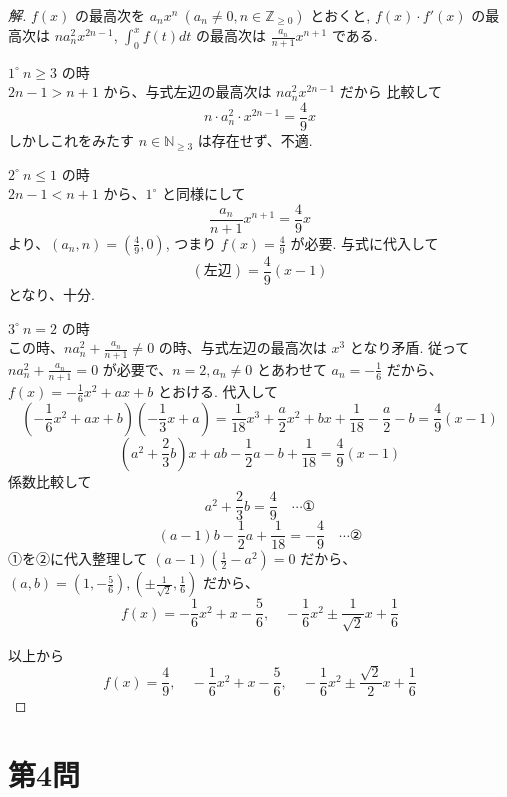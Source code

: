 \documentclass[../main.tex]{subfiles}
\begin{document}
\begin{proof}[解]
  $f(x)$ の最高次を $a_n x^n \ (a_n \ne 0, n \in \mathbb{Z}_{\ge 0})$ とおくと,
  $f(x) \cdot f'(x)$ の最高次は $n a_n^2 x^{2n-1}$, $\int_0^x f(t) dt$ の最高次は $\frac{a_n}{n+1} x^{n+1}$ である.

  \medskip
  $1^\circ \ n \ge 3$ の時\\
  $2n-1 > n+1$ から、与式左辺の最高次は $n a_n^2 x^{2n-1}$ だから 比較して
  \[
    n \cdot a_n^2 \cdot x^{2n-1} = \frac{4}{9} x
  \]
  しかしこれをみたす $n \in \mathbb{N}_{\ge 3}$ は存在せず、不適.

  \medskip
  $2^\circ \ n \le 1$ の時\\
  $2n-1 < n+1$ から、$1^\circ$ と同様にして
  \[
    \frac{a_n}{n+1} x^{n+1} = \frac{4}{9} x
  \]
  より、$(a_n, n) = \left(\frac{4}{9}, 0\right)$, つまり $f(x) = \frac{4}{9}$ が必要. 与式に代入して
  \[
    (\text{左辺}) = \frac{4}{9} (x - 1)
  \]
  となり、十分.

  \medskip
  $3^\circ \ n = 2$ の時\\
  この時、$n a_n^2 + \frac{a_n}{n+1} \ne 0$ の時、与式左辺の最高次は $x^3$ となり矛盾. 従って $n a_n^2 + \frac{a_n}{n+1} = 0$ が必要で、$n=2, a_n \ne 0$ とあわせて $a_n = -\frac{1}{6}$ だから、$f(x) = -\frac{1}{6} x^2 + ax + b$ とおける. 代入して
  \[
    \left( -\frac{1}{6} x^2 + ax + b \right) \left( -\frac{1}{3} x + a \right) = \frac{1}{18} x^3 + \frac{a}{2} x^2 + bx + \frac{1}{18} - \frac{a}{2} - b = \frac{4}{9} (x - 1)
  \]
  \[
    \left( a^2 + \frac{2}{3} b \right) x + ab - \frac{1}{2} a - b + \frac{1}{18} = \frac{4}{9} (x - 1)
  \]
  係数比較して
  \[
    a^2 + \frac{2}{3} b = \frac{4}{9} \quad \cdots \text{①}
  \]
  \[
    (a - 1) b - \frac{1}{2} a + \frac{1}{18} = -\frac{4}{9} \quad \cdots \text{②}
  \]
  ①を②に代入整理して $(a-1)\left(\frac{1}{2} - a^2\right) = 0$ だから、
  $(a, b) = \left(1, -\frac{5}{6}\right), \left(\pm \frac{1}{\sqrt{2}}, \frac{1}{6}\right)$ だから、
  \[
    f(x) = -\frac{1}{6} x^2 + x - \frac{5}{6}, \quad -\frac{1}{6} x^2 \pm \frac{1}{\sqrt{2}} x + \frac{1}{6}
  \]

  以上から
  \[
    f(x) = \frac{4}{9}, \quad -\frac{1}{6} x^2 + x - \frac{5}{6}, \quad -\frac{1}{6} x^2 \pm \frac{\sqrt{2}}{2} x + \frac{1}{6}
  \]
\end{proof}

\newpage

\section*{第4問}
\end{document}
